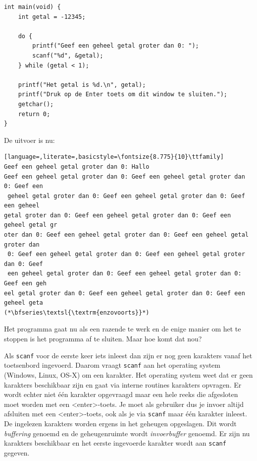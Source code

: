 \documentclass[a4paper,10pt,fleqn,twoside]{article}
\begin{document}
\begin{lstlisting}
int main(void) {
    int getal = -12345;

    do {
        printf("Geef een geheel getal groter dan 0: ");
        scanf("%d", &getal);
    } while (getal < 1);

    printf("Het getal is %d.\n", getal);
    printf("Druk op de Enter toets om dit window te sluiten.");
    getchar();
    return 0;
}
\end{lstlisting}

\newpage
De uitvoer is nu:

\begin{lstlisting}[language=,literate=,basicstyle=\fontsize{8.775}{10}\ttfamily]
Geef een geheel getal groter dan 0: Hallo
Geef een geheel getal groter dan 0: Geef een geheel getal groter dan 0: Geef een
 geheel getal groter dan 0: Geef een geheel getal groter dan 0: Geef een geheel
getal groter dan 0: Geef een geheel getal groter dan 0: Geef een geheel getal gr
oter dan 0: Geef een geheel getal groter dan 0: Geef een geheel getal groter dan
 0: Geef een geheel getal groter dan 0: Geef een geheel getal groter dan 0: Geef
 een geheel getal groter dan 0: Geef een geheel getal groter dan 0: Geef een geh
eel getal groter dan 0: Geef een geheel getal groter dan 0: Geef een geheel geta
(*\bfseries\textsl{\textrm{enzovoorts}}*)
\end{lstlisting}

Het programma gaat nu als een razende te werk en de enige manier om het te stoppen is het programma af te sluiten. Maar hoe komt dat nou?

Als \lstinline|scanf| voor de eerste keer iets inleest dan zijn er nog geen karakters vanaf het toetsenbord ingevoerd. Daarom vraagt \lstinline|scanf| aan het operating system (Windows, Linux, OS-X) om een karakter. Het operating system weet dat er geen karakters beschikbaar zijn en gaat via interne routines karakters opvragen. Er wordt echter niet \'e\'en karakter opgevraagd maar een hele reeks die afgesloten moet worden met een <enter>-toets. Je moet als gebruiker dus je invoer altijd afsluiten met een <enter>-toets, ook als je via \lstinline|scanf| maar \'e\'en karakter inleest. De ingelezen karakters worden ergens in het geheugen opgeslagen. Dit wordt \textsl{buffering} genoemd en de geheugenruimte wordt \textsl{invoerbuffer} genoemd. Er zijn nu karakters beschikbaar en het eerste ingevoerde karakter wordt aan \lstinline|scanf| gegeven.
\end{document}
